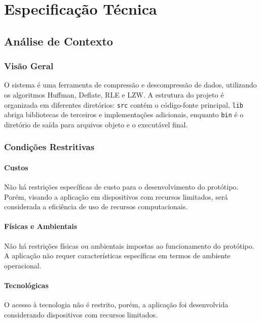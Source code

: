 \chapter{Especificação Técnica}
\label{cap:especificacao}

\section{Análise de Contexto}

\subsection{Visão Geral}

O sistema é uma ferramenta de compressão e descompressão de dados, utilizando os algoritmos Huffman, Deflate, RLE e LZW. A estrutura do projeto é organizada em diferentes diretórios: \texttt{src} contém o código-fonte principal, \texttt{lib} abriga bibliotecas de terceiros e implementações adicionais, enquanto \texttt{bin} é o diretório de saída para arquivos objeto e o executável final.

\subsection{Condições Restritivas}

\subsubsection{Custos}

Não há restrições específicas de custo para o desenvolvimento do protótipo. Porém, visando a aplicação em dispositivos com recursos limitados, será considerada a eficiência de uso de recursos computacionais.

\subsubsection{Físicas e Ambientais}

Não há restrições físicas ou ambientais impostas ao funcionamento do protótipo. A aplicação não requer características específicas em termos de ambiente operacional.

\subsubsection{Tecnológicas}

O acesso à tecnologia não é restrito, porém, a aplicação foi desenvolvida considerando dispositivos com recursos limitados.

